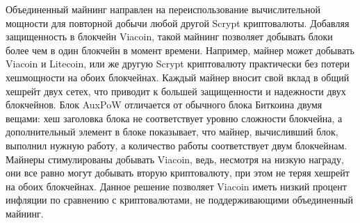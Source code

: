 \documentclass{article}
\begin{document}
\cite{auxpow} Объединенный майнинг направлен на переиспользование вычислительной
мощности для повторной добычи любой другой Scrypt криптовалюты. Добавляя
защищенность в блокчейн Viacoin, такой майнинг позволяет добывать блоки более
чем в один блокчейн в момент времени. Например, майнер может добывать Viacoin и
Litecoin, или же другую Scrypt криптовалюту практически без потери хешмощности
на обоих блокчейнах.
\newline \newline \noindent
Каждый майнер вносит свой вклад в общий хешрейт двух сетех, что приводит к большей
защищенности и надежности двух блокчейнов. Блок AuxPoW отличается от обычного
блока Биткоина двумя вещами: хеш заголовка блока не соответствует уровню сложности
блокчейна, а дополнительный элемент в блоке показывает, что майнер, вычисливший блок,
выполнил нужную работу, а количество работы соответствует двум блокчейнам.
\newline \newline \noindent
Майнеры стимулированы добывать Viacoin, ведь, несмотря на низкую награду, они
все равно могут добывать вторую криптовалюту, при этом не теряя хешрейт на обоих
блокчейнах. Данное решение позволяет Viacoin иметь низкий процент инфляции по
сравнению с криптовалютами, не поддерживающими объединенный майнинг.

\newpage
\end{document}
